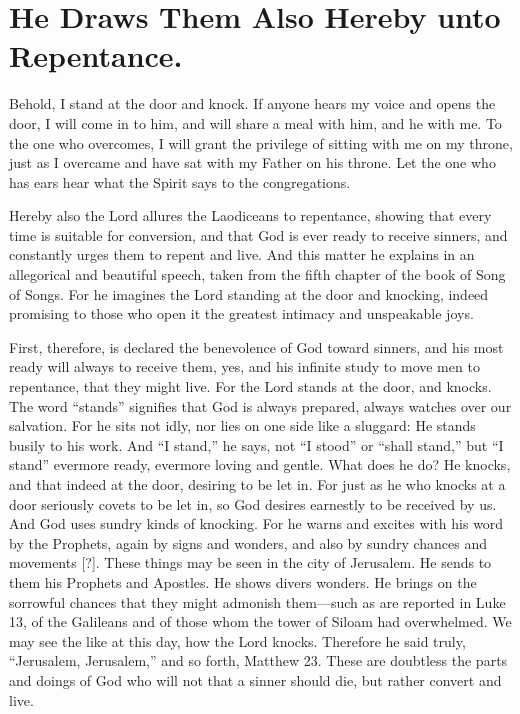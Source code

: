 \chapter[Sermon 22. He Draws Them Also Hereby unto Repentance.]{He Draws Them Also Hereby unto Repentance.}
\label{sermon:022}

Behold, I stand at the door and knock. If anyone hears my voice and opens the door, I will come in to him, and will share a meal with him, and he with me. To the one who overcomes, I will grant the privilege of sitting with me on my throne, just as I overcame and have sat with my Father on his throne. Let the one who has ears hear what the Spirit says to the congregations.

Hereby also the Lord allures the Laodiceans to repentance, showing that every time is suitable for conversion, and that God is ever ready to receive sinners, and constantly urges them to repent and live. And this matter he explains in an allegorical and beautiful speech, taken from the fifth chapter of the book of Song of Songs. For he imagines the Lord standing at the door and knocking, indeed promising to those who open it the greatest intimacy and unspeakable joys.

First, therefore, is declared the benevolence of God toward sinners, and his most ready will always to receive them, yes, and his infinite study to move men to repentance, that they might live. For the Lord stands at the door, and knocks. The word “stands” signifies that God is always prepared, always watches over our salvation. For he sits not idly, nor lies on one side like a sluggard: He stands busily to his work. And “I stand,” he says, not “I stood” or “shall stand,” but “I stand” evermore ready, evermore loving and gentle. What does he do? He knocks, and that indeed at the door, desiring to be let in. For just as he who knocks at a door seriously covets to be let in, so God desires earnestly to be received by us. And God uses sundry kinds of knocking. For he warns and excites with his word by the Prophets, again by signs and wonders, and also by sundry chances and movements [?]. These things may be seen in the city of Jerusalem. He sends to them his Prophets and Apostles. He shows divers wonders. He brings on the sorrowful chances that they might admonish them—such as are reported in Luke 13, of the Galileans and of those whom the tower of Siloam had overwhelmed. We may see the like at this day, how the Lord knocks. Therefore he said truly, “Jerusalem, Jerusalem,” and so forth, Matthew 23. These are doubtless the parts and doings of God who will not that a sinner should die, but rather convert and live.

